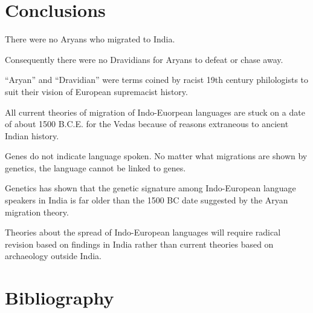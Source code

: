 \section*{Conclusions}

\item There were no Aryans who migrated to India.

 \item Consequently there were no Dravidians for Aryans to defeat or chase away.

 \item “Aryan” and “Dravidian” were terms coined by racist 19th century philologists to suit their vision of European supremacist history.

 \item All current theories of migration of Indo-Euorpean languages are stuck on a date of about 1500 B.C.E. for the Vedas because of reasons extraneous to ancient Indian history.

 \item Genes do not indicate language spoken. No matter what migrations are shown by genetics, the language cannot be linked to genes.

 \item Genetics has shown that the genetic signature among Indo-European language speakers in India is far older than the 1500 BC date suggested by the Aryan migration theory.

 \item Theories about the spread of Indo-European languages will require radical revision based on findings in India rather than current theories based on archaeology outside India.



\section*{Bibliography}

